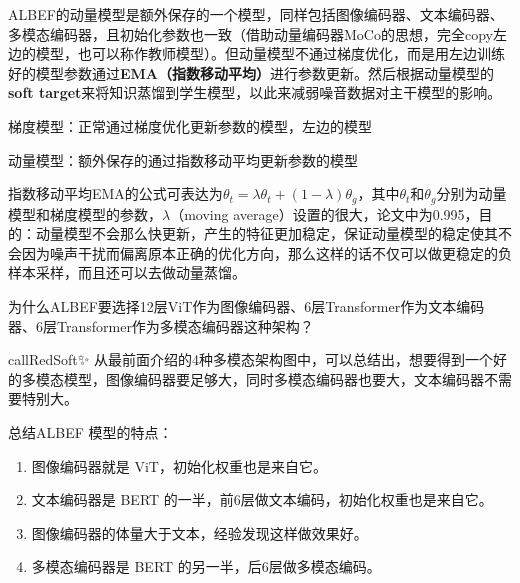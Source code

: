 \documentclass[zihao=false,fontset=windows]{ctexart}
\begin{document}
\par\vspace{0.75em}\par\vspace{0.28em}
ALBEF的动量模型是额外保存的一个模型，同样包括图像编码器、文本编码器、多模态编码器，且初始化参数也一致（借助动量编码器MoCo的思想，完全copy左边的模型，也可以称作教师模型）。但动量模型不通过梯度优化，而是用左边训练好的模型参数通过\textbf{EMA（指数移动平均）}进行参数更新。然后根据动量模型的\textbf{soft target}来将知识蒸馏到学生模型，以此来减弱噪音数据对主干模型的影响。\par
\begin{feishuquote}
梯度模型：正常通过梯度优化更新参数的模型，左边的模型\par
动量模型：额外保存的通过指数移动平均更新参数的模型\par
指数移动平均EMA的公式可表达为$\theta_t=\lambda \theta_t + (1-\lambda)\theta_g$，其中$\theta_t$和$\theta_g$分别为动量模型和梯度模型的参数，$\lambda$（moving average）设置的很大，论文中为0.995，目的：动量模型不会那么快更新，产生的特征更加稳定，保证动量模型的稳定使其不会因为噪声干扰而偏离原本正确的优化方向，那么这样的话不仅可以做更稳定的负样本采样，而且还可以去做动量蒸馏。\par
\end{feishuquote}
\par\vspace{0.75em}\par\vspace{0.28em}
为什么ALBEF要选择12层ViT作为图像编码器、6层Transformer作为文本编码器、6层Transformer作为多模态编码器这种架构？\par
\begin{feishubox}{callRedSoft}{✨}
从最前面介绍的4种多模态架构图中，可以总结出，想要得到一个好的多模态模型，图像编码器要足够大，同时多模态编码器也要大，文本编码器不需要特别大。\par
\end{feishubox}
总结ALBEF 模型的特点：\par
\begin{enumerate}
\item 图像编码器就是 ViT，初始化权重也是来自它。
\item 文本编码器是 BERT 的一半，前6层做文本编码，初始化权重也是来自它。
\item 图像编码器的体量大于文本，经验发现这样做效果好。
\item 多模态编码器是 BERT 的另一半，后6层做多模态编码。
\end{enumerate}
\end{document}
